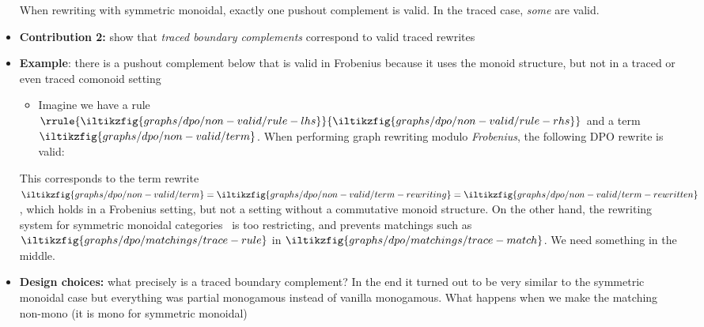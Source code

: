\begin{itemize}
        When rewriting with symmetric monoidal, exactly one pushout complement
        is valid.
        In the traced case, \emph{some} are valid.
    \item \textbf{Contribution 2:} show that \emph{traced boundary complements}
        correspond to valid traced rewrites
    \item \textbf{Example}: there is a pushout complement below that is valid
        in Frobenius because it uses the monoid structure, but not in a
        traced or even traced comonoid setting
    \begin{itemize}
        \item Imagine we have a rule \(\rrule{
            \iltikzfig{graphs/dpo/non-valid/rule-lhs}
        }{
            \iltikzfig{graphs/dpo/non-valid/rule-rhs}
        }\) and a term \(
            \iltikzfig{graphs/dpo/non-valid/term}
        \).
        When performing graph rewriting modulo \emph{Frobenius}, the following
        DPO rewrite is valid:
    \end{itemize}
    \begin{center}
        
    \end{center}
    This corresponds to the term rewrite \(
        \iltikzfig{graphs/dpo/non-valid/term}
        =
        \iltikzfig{graphs/dpo/non-valid/term-rewriting}
        =
        \iltikzfig{graphs/dpo/non-valid/term-rewritten}
    \), which holds in a Frobenius setting, but not a setting without a
    commutative monoid structure.
    On the other hand, the rewriting system for symmetric monoidal categories~\cite{bonchi2022stringa}
    is too restricting, and prevents matchings such as \(
        \iltikzfig{graphs/dpo/matchings/trace-rule}
    \) in \(
        \iltikzfig{graphs/dpo/matchings/trace-match}
    \).
    We need something in the middle.
    \item \textbf{Design choices:} what precisely is a traced boundary
        complement? In the end it turned out to be very similar to the symmetric
        monoidal case but everything was partial monogamous instead of vanilla
        monogamous. What happens when we make the matching non-mono (it is mono
        for symmetric monoidal)
\end{itemize}